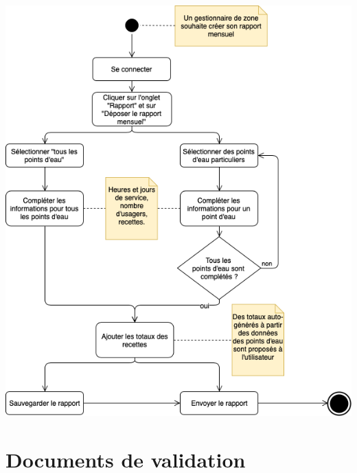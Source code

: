 \documentclass{EPL-master-thesis-covers-FR}
\begin{document}
			\begin{center}
				\includegraphics[scale=.5]{images/activity_report}
			\end{center}

	\chapter{Documents de validation}

		\label{sec:documents_validation}
		

	\setlength{\parskip}{0em}
	\backcoverpage
\end{document}
